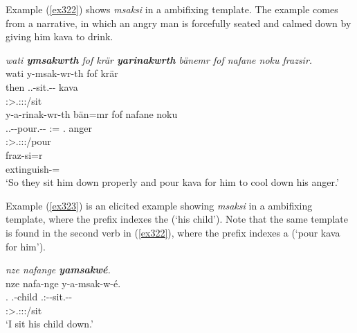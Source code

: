 Example (\ref{ex322}) shows \emph{msaksi} in a  ambifixing template. The example comes from a narrative, in which an angry man is forcefully seated and calmed down by giving him kava to drink.

\begin{exe}
	\ex \emph{wati \textbf{ymsakwrth} fof krär \textbf{yarinakwrth} bänemr fof nafane noku frazsir.}\\
	\glll wati y-msak-wr-th fof krär\\
	then \Tsg.\Masc.\Alph-sit.\Ext-\Ndu-\Stnsg{} \Emph{} kava\\
	{} \footnotesize{\Stpl:\Sbj>\Tsg.\Masc:\Obj:\Nonpast:\Ipfv/sit} {} {}\\
	\sn
	\glll y-a-rinak-wr-th bän=mr fof nafane noku\\
	\Tsg.\Masc.\Alph-\Vc-pour.\Ext-\Ndu-\Stnsg{} \Dem:\Med=\Purp{} \Emph{} \Tsg.\Poss{} anger\\
	\footnotesize{\Stpl:\Sbj>\Tsg.\Masc:\Io:\Nonpast:\Ipfv/pour} {} {} {}\\
	\sn
	\gll fraz-si=r\\
	extinguish-\Nmlz=\Purp{}\\
	\trans `So they sit him down properly and pour kava for him to cool down his anger.' 
	\label{ex322}
\end{exe}

Example (\ref{ex323}) is an elicited example showing \emph{msaksi} in a  ambifixing template, where the  prefix indexes the  (`his child'). Note that the same template is found in the second verb in (\ref{ex322}), where the  prefix indexes a  (`pour kava for him').

\begin{exe}
	\ex \textit{nze nafange \textbf{yamsakwé}.}\\
	\glll nze nafa-nge y-a-msak-w-é.\\
	 \Fsg{}.\Erg{} \Third.\Poss-child \Tsg{}.\Masc{}:\Alph{}-\Vc{}-sit.\Ext{}-\Ndu{}-\Fsg{}\\
	  {} {} \footnotesize{\Fsg:\Sbj>\Tsg.\Masc:\Io:\Nonpast:\Ipfv/sit}\\
	\trans `I sit his child down.'
	\label{ex323}
\end{exe}

